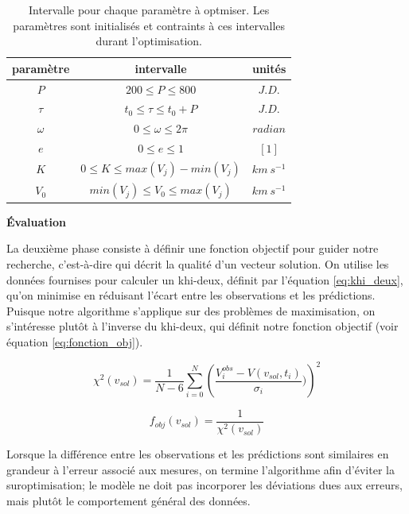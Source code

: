 \documentclass{article}
\begin{document}
\begin{table}[H]
	\begin{center}
		\caption{Intervalle pour chaque paramètre à optmiser. Les paramètres sont initialisés et contraints à ces intervalles durant l'optimisation.}
		\label{tab:intervalles}
		\begin{tabular}{c|c|c} %
			\textbf{paramètre} & \textbf{intervalle} & \textbf{unités}\\
			\hline	
			\hline
			$P$ & $200 \le P \le 800 $ & $J.D.$\\
			$\tau$ & $t_0 \le \tau \le t_0 + P$ & $J.D.$\\
			$\omega$ & $0 \le \omega \le 2 \pi$ & $radian$\\
			$e$ & $0 \le e \le 1$ & $[1]$\\
			$K$ & $0 \le K \le max(V_j)-min(V_j)$ & $km\ s^{-1}$\\
			$V_0$ & $min(V_j) \le V_0 \le max(V_j)$ & $km\ s^{-1}$\\
		\end{tabular}
	\end{center}
\end{table}

\vspace{0.3cm}
\noindent\textbf{Évaluation}

La deuxième phase consiste à définir une fonction objectif pour guider notre recherche, c'est-à-dire qui décrit la qualité d'un vecteur solution. On utilise les données fournises\cite{diro} pour calculer un khi-deux, définit par l'équation \ref{eq:khi_deux}, qu'on minimise en réduisant l'écart entre les observations et les prédictions. Puisque notre algorithme s'applique sur des problèmes de maximisation, on s'intéresse plutôt à l'inverse du khi-deux, qui définit notre fonction objectif (voir équation \ref{eq:fonction_obj}). 

\begin{equation}\label{eq:khi_deux}
	\chi^2(v_{sol}) = \frac{1}{N-6} \sum_{i=0}^{N} \left(\frac{V_{i}^{obs} - V(v_{sol}, t_i)}{\sigma_i})\right)^2
\end{equation}

\begin{equation}\label{eq:fonction_obj}
	f_{obj}(v_{sol}) = \frac{1}{\chi^2(v_{sol})}
\end{equation}

Lorsque la différence entre les observations et les prédictions sont similaires en grandeur à l'erreur associé aux mesures, on termine l'algorithme afin d'éviter la suroptimisation; le modèle ne doit pas incorporer les déviations dues aux erreurs, mais plutôt le comportement général des données.
\end{document}
